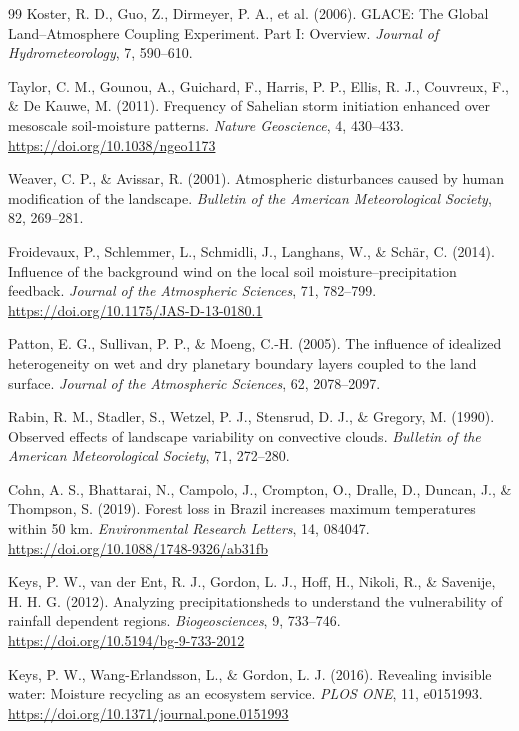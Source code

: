 \documentclass[10pt,twocolumn]{article}
\begin{document}
\begin{thebibliography}{99}
Koster, R. D., Guo, Z., Dirmeyer, P. A., et al. (2006). GLACE: The Global Land--Atmosphere Coupling Experiment. Part I: Overview. \textit{Journal of Hydrometeorology}, 7, 590--610.

Taylor, C. M., Gounou, A., Guichard, F., Harris, P. P., Ellis, R. J., Couvreux, F., \& De Kauwe, M. (2011). Frequency of Sahelian storm initiation enhanced over mesoscale soil-moisture patterns. \textit{Nature Geoscience}, 4, 430--433. \url{https://doi.org/10.1038/ngeo1173}

Weaver, C. P., \& Avissar, R. (2001). Atmospheric disturbances caused by human modification of the landscape. \textit{Bulletin of the American Meteorological Society}, 82, 269--281.

Froidevaux, P., Schlemmer, L., Schmidli, J., Langhans, W., \& Sch\"ar, C. (2014). Influence of the background wind on the local soil moisture--precipitation feedback. \textit{Journal of the Atmospheric Sciences}, 71, 782--799. \url{https://doi.org/10.1175/JAS-D-13-0180.1}

Patton, E. G., Sullivan, P. P., \& Moeng, C.-H. (2005). The influence of idealized heterogeneity on wet and dry planetary boundary layers coupled to the land surface. \textit{Journal of the Atmospheric Sciences}, 62, 2078--2097.

Rabin, R. M., Stadler, S., Wetzel, P. J., Stensrud, D. J., \& Gregory, M. (1990). Observed effects of landscape variability on convective clouds. \textit{Bulletin of the American Meteorological Society}, 71, 272--280.

Cohn, A. S., Bhattarai, N., Campolo, J., Crompton, O., Dralle, D., Duncan, J., \& Thompson, S. (2019). Forest loss in Brazil increases maximum temperatures within 50 km. \textit{Environmental Research Letters}, 14, 084047. \url{https://doi.org/10.1088/1748-9326/ab31fb}

Keys, P. W., van der Ent, R. J., Gordon, L. J., Hoff, H., Nikoli, R., \& Savenije, H. H. G. (2012). Analyzing precipitationsheds to understand the vulnerability of rainfall dependent regions. \textit{Biogeosciences}, 9, 733--746. \url{https://doi.org/10.5194/bg-9-733-2012}

Keys, P. W., Wang-Erlandsson, L., \& Gordon, L. J. (2016). Revealing invisible water: Moisture recycling as an ecosystem service. \textit{PLOS ONE}, 11, e0151993. \url{https://doi.org/10.1371/journal.pone.0151993}


\end{thebibliography}
\end{document}
